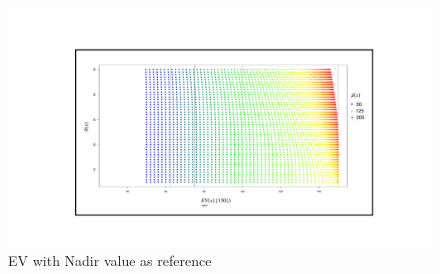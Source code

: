 \begin{figure}[h!]
    \centering
    \includegraphics[scale=0.3]{Chapter5/Pictures/EV_nad}
    \caption{EV with Nadir value as reference}
    \label{fig:EV_1.5}
\end{figure}










